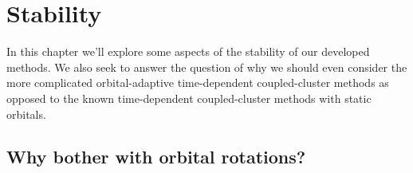 \chapter{Stability}
    \label{chap:stability}
    In this chapter we'll explore some aspects of the stability of our developed
    methods.
    We also seek to answer the question of why we should even consider the more
    complicated orbital-adaptive time-dependent coupled-cluster methods as
    opposed to the known time-dependent coupled-cluster methods with static
    orbitals.

    \section{Why bother with orbital rotations?}
